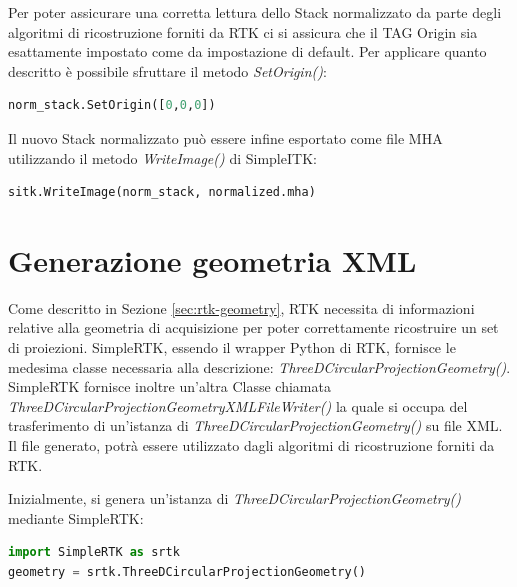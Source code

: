 \documentclass[a4paper,12pt, doubleside]{report}
\begin{document}
                Per poter assicurare una corretta lettura dello Stack normalizzato da parte degli algoritmi di ricostruzione forniti da RTK ci si assicura che il TAG Origin sia esattamente impostato come da impostazione di default. Per applicare quanto descritto è possibile sfruttare il metodo \textit{SetOrigin()}:
                
                \begin{lstlisting}[language=python, frame=bt]
norm_stack.SetOrigin([0,0,0])
                \end{lstlisting}
                
                Il nuovo Stack normalizzato può essere infine esportato come file MHA utilizzando il metodo \textit{WriteImage()} di SimpleITK:
                
                \begin{lstlisting}[language=python, frame=bt]
sitk.WriteImage(norm_stack, normalized.mha)
                \end{lstlisting}
                
        \section{Generazione geometria XML}
            \label{sec:rtk-build-geometry}
            \par
                Come descritto in Sezione \ref{sec:rtk-geometry}, RTK necessita di informazioni relative alla geometria di acquisizione per poter correttamente ricostruire un set di proiezioni. SimpleRTK, essendo il wrapper Python di RTK, fornisce le medesima classe necessaria alla descrizione: \textit{ThreeDCircularProjectionGeometry()}. SimpleRTK fornisce inoltre un'altra Classe chiamata \textit{ThreeDCircularProjectionGeometryXMLFileWriter()} la quale si occupa del trasferimento di un'istanza di \textit{ThreeDCircularProjectionGeometry()} su file XML. Il file generato, potrà essere utilizzato dagli algoritmi di ricostruzione forniti da RTK.
                
            \bigskip
            \par
                Inizialmente, si genera un'istanza di \textit{ThreeDCircularProjectionGeometry()} mediante SimpleRTK:
                \begin{lstlisting}[language=python, frame=bt]
import SimpleRTK as srtk
geometry = srtk.ThreeDCircularProjectionGeometry()
                \end{lstlisting}
                    
\end{document}
